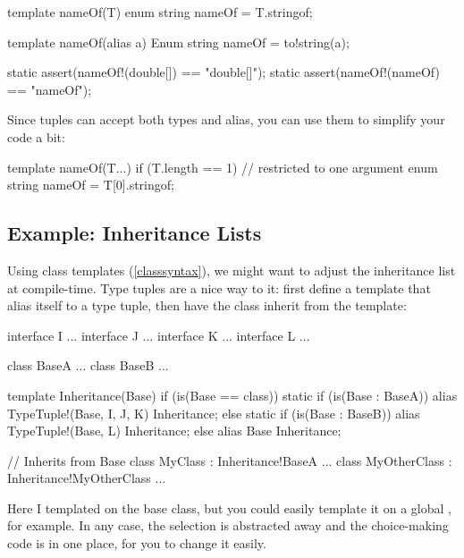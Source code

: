 \begin{dcode}
template nameOf(T)
{
    enum string nameOf = T.stringof;
}

template nameOf(alias a)
{
    Enum string nameOf = to!string(a);
}

static assert(nameOf!(double[]) == "double[]");
static assert(nameOf!(nameOf) == "nameOf");
\end{dcode}

Since tuples can accept both types and alias, you can use them to simplify your code a bit:

\begin{dcode}
template nameOf(T...) if (T.length == 1) // restricted to one argument
{
    enum string nameOf = T[0].stringof;
}
\end{dcode}


\subsection{Example: Inheritance Lists}\label{inheritancelist}


Using class templates (\ref{classsyntax}), we might want to adjust the inheritance list at compile-time. Type tuples are a nice way to it: first define a template that alias itself to a type tuple, then have the class inherit from the template:

\begin{dcode}
interface I { ... }
interface J { ... }
interface K { ... }
interface L { ... }

class BaseA { ... }
class BaseB { ... }

template Inheritance(Base) if (is(Base == class))
{
    static if (is(Base : BaseA))
        alias TypeTuple!(Base, I, J, K) Inheritance;
    else static if (is(Base : BaseB))
        alias TypeTuple!(Base, L)       Inheritance;
    else
        alias Base                      Inheritance;
}

// Inherits from Base
class MyClass : Inheritance!BaseA { ... }
class MyOtherClass : Inheritance!MyOtherClass { ... }
\end{dcode}

Here I templated  on the base class, but you could easily template it on a global , for example. In any case, the selection is abstracted away and the choice-making code is in one place, for you to change it easily.

